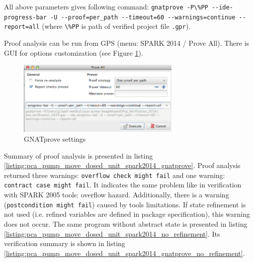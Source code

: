 All above parameters gives following command: \lstinline{gnatprove -P\%PP --ide-progress-bar -U --proof=per_path --timeout=60 --warnings=continue --report=all} (where \lstinline{\%PP} is path of verified project file \lstinline{.gpr}).

Proof analysis can be run from GPS (menu: SPARK 2014 / Prove All). There is GUI for options customization (see Figure \ref{figure:gnatprove-settings}).

\begin{figure}[ht]%
    \begin{center}
        \includegraphics[width=0.7\textwidth]{figures/gnatprove-settings.png}        
    \end{center}
    \caption{GNATprove settings}
    \label{figure:gnatprove-settings}
\end{figure}

Summary of proof analysis is presented in listing \ref{listing:pca_pump_move_dosed_unit_spark2014_gnatprove}. Proof analysis returned three warnings: \lstinline{overflow check might fail} and one warning: \lstinline{contract case might fail}. It indicates the same problem like in verification with SPARK 2005 tools: overflow hazard. Additionally, there is a warning (\lstinline{postcondition might fail}) caused by tools limitations. If state refinement is not used (i.e. refined variables are defined in package specification), this warning does not occur. The same program without abstract state is presented in listing \ref{listing:pca_pump_move_dosed_unit_spark2014_no_refinement}. Its verification summary is shown in listing \ref{listing:pca_pump_move_dosed_unit_spark2014_gnatprove_no_refinement}. 


